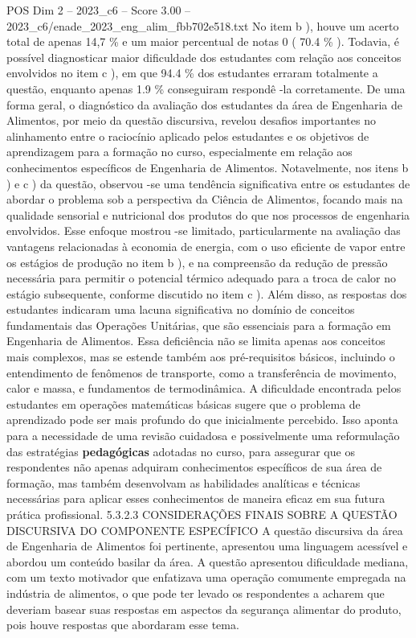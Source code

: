 \begin{textsample}{POS Dim 2 – 2023\_c6 – Score 3.00 – 2023\_c6/enade\_2023\_eng\_alim\_fbb702e518.txt}
No item b ), houve um acerto total de apenas 14,7 \% e um maior percentual de notas 0 ( 70.4 \% ).
Todavia, é possível diagnosticar maior dificuldade dos estudantes com relação aos conceitos envolvidos no item c ), em que 94.4 \% dos estudantes erraram totalmente a questão, enquanto apenas 1.9 \% conseguiram respondê -la corretamente.
De uma forma geral, o diagnóstico da avaliação dos estudantes da área de Engenharia de Alimentos, por meio da questão discursiva, revelou desafios importantes no alinhamento entre o raciocínio aplicado pelos estudantes e os objetivos de aprendizagem para a formação no curso, especialmente em relação aos conhecimentos específicos de Engenharia de Alimentos.
Notavelmente, nos itens b ) e c ) da questão, observou -se uma tendência significativa entre os estudantes de abordar o problema sob a perspectiva da Ciência de Alimentos, focando mais na qualidade sensorial e nutricional dos produtos do que nos processos de engenharia envolvidos.
Esse enfoque mostrou -se limitado, particularmente na avaliação das vantagens relacionadas à economia de energia, com o uso eficiente de vapor entre os estágios de produção no item b ), e na compreensão da redução de pressão necessária para permitir o potencial térmico adequado para a troca de calor no estágio subsequente, conforme discutido no item c ).
Além disso, as respostas dos estudantes indicaram uma lacuna significativa no domínio de conceitos fundamentais das Operações Unitárias, que são essenciais para a formação em Engenharia de Alimentos.
Essa deficiência não se limita apenas aos conceitos mais complexos, mas se estende também aos pré-requisitos básicos, incluindo o entendimento de fenômenos de transporte, como a transferência de movimento, calor e massa, e fundamentos de termodinâmica.
A dificuldade encontrada pelos estudantes em operações matemáticas básicas sugere que o problema de aprendizado pode ser mais profundo do que inicialmente percebido.
Isso aponta para a necessidade de uma revisão cuidadosa e possivelmente uma reformulação das estratégias \textbf{pedagógicas} adotadas no curso, para assegurar que os respondentes não apenas adquiram conhecimentos específicos de sua área de formação, mas também desenvolvam as habilidades analíticas e técnicas necessárias para aplicar esses conhecimentos de maneira eficaz em sua futura prática profissional. 5.3.2.3 CONSIDERAÇÕES FINAIS SOBRE A QUESTÃO DISCURSIVA DO COMPONENTE ESPECÍFICO A questão discursiva da área de Engenharia de Alimentos foi pertinente, apresentou uma linguagem acessível e abordou um conteúdo basilar da área.
A questão apresentou dificuldade mediana, com um texto motivador que enfatizava uma operação comumente empregada na indústria de alimentos, o que pode ter levado os respondentes a acharem que deveriam basear suas respostas em aspectos da segurança alimentar do produto, pois houve respostas que abordaram esse tema.

\end{textsample}
